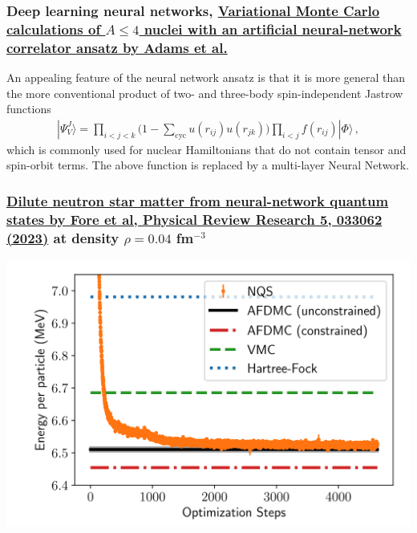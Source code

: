 \documentclass{beamer}
\begin{document}
\begin{frame}
\frametitle{Deep learning neural networks, \href{{https://journals.aps.org/prl/abstract/10.1103/PhysRevLett.127.022502}}{Variational Monte Carlo calculations of $A\le 4$ nuclei with an artificial neural-network correlator ansatz by Adams et al.}}

An appealing feature of the neural network ansatz is that it is more general than the more conventional product of two-
and three-body spin-independent Jastrow functions
\begin{align}
|\Psi_V^J \rangle = \prod_{i<j<k} \Big( 1-\sum_{\text{cyc}} u(r_{ij}) u(r_{jk})\Big) \prod_{i<j} f(r_{ij}) | \Phi\rangle\,,
\end{align}
which is commonly used for nuclear Hamiltonians that do not contain tensor and spin-orbit terms.
The above function is replaced by a multi-layer Neural Network.
\end{frame}

\begin{frame}
\frametitle{\href{{https://journals.aps.org/prresearch/pdf/10.1103/PhysRevResearch.5.033062}}{Dilute neutron star matter from neural-network quantum states by Fore et al, Physical Review Research 5, 033062 (2023)} at density $\rho=0.04$ fm$^{-3}$}

\begin{block}{}

\vspace{6mm}

\centerline{\includegraphics[width=0.9\linewidth]{figures/nmatter.png}}

\vspace{6mm}

\end{block}
\end{frame}
\end{document}
